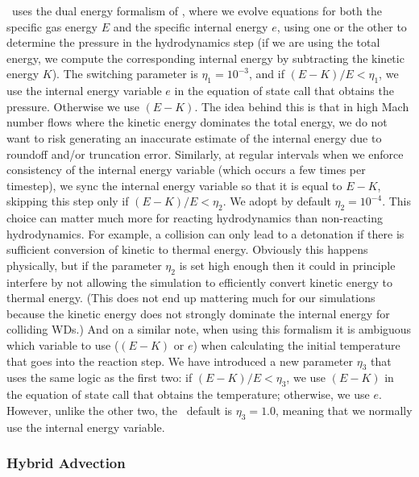 \documentclass[12pt]{article}
\begin{document}
\castro\ uses the dual energy formalism of \cite{bryan:1995,ENZO}, where we evolve equations
for both the specific gas energy $E$ and the specific internal energy $e$, using one or the other to
determine the pressure in the hydrodynamics step (if we are using the total energy, we
compute the corresponding internal energy by subtracting the kinetic energy $K$). The switching
parameter is $\eta_1 = 10^{-3}$, and if $(E - K) / E < \eta_1$, we use the internal energy variable $e$
in the equation of state call that obtains the pressure. Otherwise we use $(E - K)$. The
idea behind this is that in high Mach number flows where the kinetic energy dominates the
total energy, we do not want to risk generating an inaccurate estimate of the internal energy
due to roundoff and/or truncation error. Similarly, at regular intervals when we enforce consistency of the
internal energy variable (which occurs a few times per timestep), we sync the internal energy
variable so that it is equal to $E - K$, skipping this step only if $(E - K) / E < \eta_2$.
We adopt by default $\eta_2 = 10^{-4}$. This choice can matter much more for reacting
hydrodynamics than non-reacting hydrodynamics. For example, a collision can only lead to a
detonation if there is sufficient conversion of kinetic to thermal energy. Obviously
this happens physically, but if the parameter $\eta_2$ is set high enough then it could
in principle interfere by not allowing the simulation to efficiently convert kinetic energy
to thermal energy. (This does not end up mattering much for our simulations because the
kinetic energy does not strongly dominate the internal energy for colliding WDs.) And on
a similar note, when using this formalism it is ambiguous which variable to use ($(E - K)$
or $e$) when calculating the initial temperature that goes into the reaction step. We
have introduced a new parameter $\eta_3$ that uses the same logic as the first two: if
$(E - K) / E < \eta_3$, we use $(E - K)$ in the equation of state call that obtains the
temperature; otherwise, we use $e$. However, unlike the other two, the \castro\ default
is $\eta_3 = 1.0$, meaning that we normally use the internal energy variable.



\subsubsection{Hybrid Advection}
\label{sec:hybrid_advection}
\end{document}
